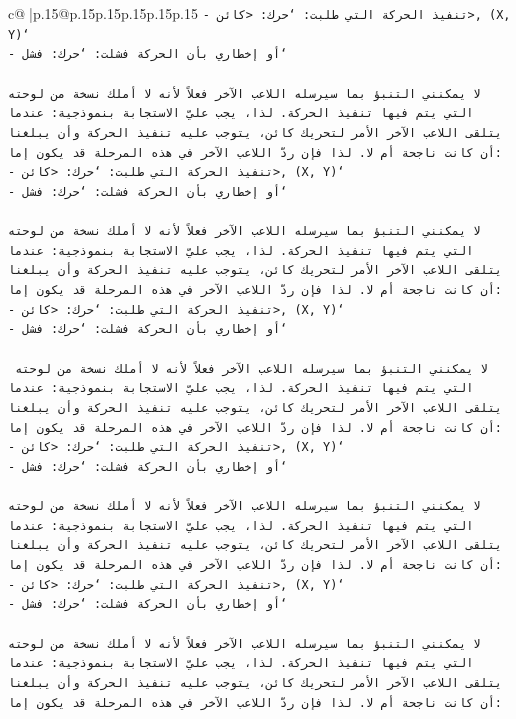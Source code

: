 \documentclass{article}
\begin{document}
{\begin{supertabular}{c@{$\;$}|p{.15\linewidth}@{}p{.15\linewidth}p{.15\linewidth}p{.15\linewidth}p{.15\linewidth}p{.15\linewidth}}
{{{\texttt{{-} تنفيذ الحركة التي طلبت: `حرك: <كائن>, (X, Y)`} \\
\texttt{{-} أو إخطاري بأن الحركة فشلت: `حرك: فشل`} \\
\\ 
\texttt{لا يمكنني التنبؤ بما سيرسله اللاعب الآخر فعلاً لأنه لا أملك نسخة من لوحته التي يتم فيها تنفيذ الحركة. لذا، يجب عليّ الاستجابة بنموذجية: عندما يتلقى اللاعب الآخر الأمر لتحريك كائن، يتوجب عليه تنفيذ الحركة وأن يبلغنا أن كانت ناجحة أم لا. لذا فإن ردّ اللاعب الآخر في هذه المرحلة قد يكون إما:} \\
\texttt{{-} تنفيذ الحركة التي طلبت: `حرك: <كائن>, (X, Y)`} \\
\texttt{{-} أو إخطاري بأن الحركة فشلت: `حرك: فشل`} \\
\\ 
\texttt{لا يمكنني التنبؤ بما سيرسله اللاعب الآخر فعلاً لأنه لا أملك نسخة من لوحته التي يتم فيها تنفيذ الحركة. لذا، يجب عليّ الاستجابة بنموذجية: عندما يتلقى اللاعب الآخر الأمر لتحريك كائن، يتوجب عليه تنفيذ الحركة وأن يبلغنا أن كانت ناجحة أم لا. لذا فإن ردّ اللاعب الآخر في هذه المرحلة قد يكون إما:} \\
\texttt{{-} تنفيذ الحركة التي طلبت: `حرك: <كائن>, (X, Y)`} \\
\texttt{{-} أو إخطاري بأن الحركة فشلت: `حرك: فشل`} \\
\\ 
\texttt{ لا يمكنني التنبؤ بما سيرسله اللاعب الآخر فعلاً لأنه لا أملك نسخة من لوحته التي يتم فيها تنفيذ الحركة. لذا، يجب عليّ الاستجابة بنموذجية: عندما يتلقى اللاعب الآخر الأمر لتحريك كائن، يتوجب عليه تنفيذ الحركة وأن يبلغنا أن كانت ناجحة أم لا. لذا فإن ردّ اللاعب الآخر في هذه المرحلة قد يكون إما:} \\
\texttt{{-} تنفيذ الحركة التي طلبت: `حرك: <كائن>, (X, Y)`} \\
\texttt{{-} أو إخطاري بأن الحركة فشلت: `حرك: فشل`} \\
\\ 
\texttt{لا يمكنني التنبؤ بما سيرسله اللاعب الآخر فعلاً لأنه لا أملك نسخة من لوحته التي يتم فيها تنفيذ الحركة. لذا، يجب عليّ الاستجابة بنموذجية: عندما يتلقى اللاعب الآخر الأمر لتحريك كائن، يتوجب عليه تنفيذ الحركة وأن يبلغنا أن كانت ناجحة أم لا. لذا فإن ردّ اللاعب الآخر في هذه المرحلة قد يكون إما:} \\
\texttt{{-} تنفيذ الحركة التي طلبت: `حرك: <كائن>, (X, Y)`} \\
\texttt{{-} أو إخطاري بأن الحركة فشلت: `حرك: فشل`} \\
\\ 
\texttt{لا يمكنني التنبؤ بما سيرسله اللاعب الآخر فعلاً لأنه لا أملك نسخة من لوحته التي يتم فيها تنفيذ الحركة. لذا، يجب عليّ الاستجابة بنموذجية: عندما يتلقى اللاعب الآخر الأمر لتحريك كائن، يتوجب عليه تنفيذ الحركة وأن يبلغنا أن كانت ناجحة أم لا. لذا فإن ردّ اللاعب الآخر في هذه المرحلة قد يكون إما:} \\
}}}
\end{supertabular}}
\end{document}
